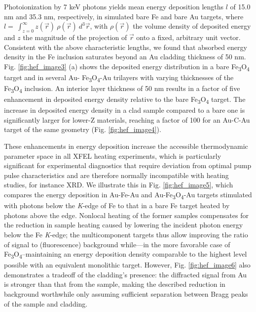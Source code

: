 Photoionization by 7 keV photons yields mean energy deposition lengths
\(l\) of 15.0 nm and 35.3 nm, respectively, in simulated bare Fe and
bare Au targets, where
\(l = \ \int_{z = 0}^{\infty}{z(\overrightarrow{r})\ \rho\left( \overrightarrow{r} \right)\ d^{3}\overrightarrow{r}}\),
with \(\rho\left( \overrightarrow{r} \right)\) the volume density of
deposited energy and \(z\) the magnitude of the projection of
\(\overrightarrow{r}\) onto a fixed, arbitrary unit vector. Consistent
with the above characteristic lengths, we found that absorbed energy
density in the Fe inclusion saturates beyond an Au cladding thickness of
50 nm. Fig. \ref{fig:hef_image3} (a) shows the deposited energy distribution in a bare
Fe\textsubscript{3}O\textsubscript{4} target and in several Au-
Fe\textsubscript{3}O\textsubscript{4}-Au trilayers with varying
thicknesses of the Fe\textsubscript{3}O\textsubscript{4} inclusion. An
interior layer thickness of 50 nm results in a factor of five
enhancement in deposited energy density relative to the bare
Fe\textsubscript{3}O\textsubscript{4} target. The increase in deposited
energy density in a clad sample compared to a bare one is significantly
larger for lower-Z materials, reaching a factor of 100 for an Au-C-Au
target of the same geometry (Fig. \ref{fig:hef_image4}).

These enhancements in energy deposition increase the accessible
thermodynamic parameter space in all XFEL heating experiments, which is
particularly significant for experimental diagnostics that require
deviation from optimal pump pulse characteristics and are therefore
normally incompatible with heating studies, for instance XRD. We
illustrate this in Fig. \ref{fig:hef_image5}, which compares the energy deposition in
Au-Fe-Au and Au-Fe\textsubscript{3}O\textsubscript{4}-Au targets
stimulated with photons below the \emph{K}-edge of Fe to that in a bare
Fe target heated by photons above the edge. Nonlocal heating of the
former samples compensates for the reduction in sample heating caused by
lowering the incident photon energy below the Fe \emph{K}-edge; the
multicomponent targets thus allow improving the ratio of signal to
(fluorescence) background while---in the more favorable case of
Fe\textsubscript{3}O\textsubscript{4}--maintaining an energy deposition
density comparable to the highest level possible with an equivalent
monolithic target. However, Fig. \ref{fig:hef_image6} also demonstrates a tradeoff of the
cladding's presence: the diffracted signal from Au is stronger than that
from the sample, making the described reduction in background worthwhile
only assuming sufficient separation between Bragg peaks of the sample
and cladding.

